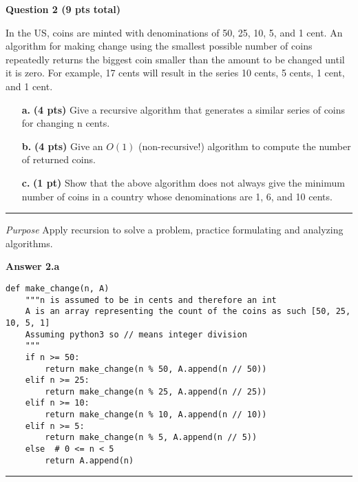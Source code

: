 \documentclass{article}
\begin{document}
\begin{framed}
    \textbf{Question 2 (9 pts total)} 
    
    In the US, coins are minted with denominations of 50, 25, 10, 5, and 1 
    cent. An algorithm for making change using the smallest possible number of
    coins repeatedly returns the biggest coin smaller than the amount to be
    changed until it is zero. For example, 17 cents will result in the series 
    10 cents, 5 cents, 1 cent, and 1 cent. 
    
    \begin{enumerate}
        \item[\textbf{a.}] \textbf{(4 pts)} Give a recursive algorithm that 
        generates a similar series of coins for changing n cents. 
        
        \item[\textbf{b.}] \textbf{(4 pts)} Give an $O(1)$ (non-recursive!)
        algorithm to compute the number of returned coins. 
        
        \item[\textbf{c.}] \textbf{(1 pt)} Show that the above algorithm does
        not always give the minimum number of coins in a country whose
        denominations are 1, 6, and 10 cents.
        
    \end{enumerate}
    
    \rule{\textwidth}{.2pt}
    
    \textit{Purpose} Apply recursion to solve a problem, practice formulating
    and analyzing algorithms. 
\end{framed}


\textbf{Answer 2.a}
\begin{verbatim}
def make_change(n, A)
    """n is assumed to be in cents and therefore an int
    A is an array representing the count of the coins as such [50, 25, 10, 5, 1]
    Assuming python3 so // means integer division
    """
    if n >= 50: 
        return make_change(n % 50, A.append(n // 50))
    elif n >= 25: 
        return make_change(n % 25, A.append(n // 25))
    elif n >= 10: 
        return make_change(n % 10, A.append(n // 10))
    elif n >= 5: 
        return make_change(n % 5, A.append(n // 5))
    else  # 0 <= n < 5 
        return A.append(n)
\end{verbatim}
\rule{\textwidth}{.2pt}
\end{document}
